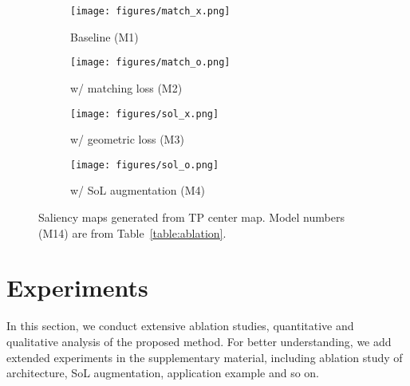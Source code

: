 \documentclass[letterpaper]{article} \usepackage{aaai22}  \usepackage{times}  \usepackage{helvet}  \usepackage{courier}  \usepackage[hyphens]{url}  \usepackage{graphicx} \urlstyle{rm} \def\UrlFont{\rm}  \usepackage{natbib}  \usepackage{caption} \DeclareCaptionStyle{ruled}{labelfont=normalfont,labelsep=colon,strut=off} \frenchspacing  \setlength{\pdfpagewidth}{8.5in}  \setlength{\pdfpageheight}{11in}  \usepackage{algorithm}
\begin{document}
\begin{figure}[t!]
    \centering
     \begin{subfigure}[b]{0.48\columnwidth}
        \centering\texttt{[image: figures/match\_x.png]}
         \caption{Baseline (M1)}
         \label{fig:match_x}
     \end{subfigure}
    \begin{subfigure}[b]{0.48\columnwidth}
        \centering\texttt{[image: figures/match\_o.png]}
         \caption{w/ matching loss (M2)}
         \label{fig:match_o}
     \end{subfigure}
     \begin{subfigure}[b]{0.48\columnwidth}
        \centering\texttt{[image: figures/sol\_x.png]}
         \caption{w/ geometric loss (M3)}
         \label{fig:sol_x}
     \end{subfigure}
    \begin{subfigure}[b]{0.48\columnwidth}
        \centering\texttt{[image: figures/sol\_o.png]}
         \caption{w/ SoL augmentation (M4)}
         \label{fig:sol_o}
     \end{subfigure}
\caption{Saliency maps generated from TP center map. Model numbers (M14) are from Table~\ref{table:ablation}.}
\label{fig:comparison_cam}
\end{figure}

\section{Experiments}
In this section, we conduct extensive ablation studies, quantitative and qualitative analysis of the proposed method.
For better understanding, we add extended experiments in the supplementary material, including ablation study of architecture, SoL augmentation, application example and so on.
\end{document}
